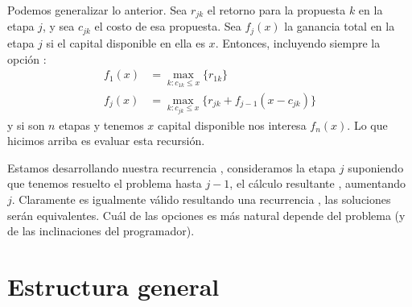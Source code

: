   Podemos generalizar lo anterior.
  Sea \(r_{j k}\) el retorno para la propuesta \(k\) en la etapa \(j\),
  y sea \(c_{j k}\) el costo de esa propuesta.
  Sea \(f_j(x)\) la ganancia total en la etapa \(j\)
  si el capital disponible en ella es \(x\).
  Entonces,
  incluyendo siempre la opción
  :
  \begin{align*}
    f_1(x)
      &= \max_{k \colon c_{1 k} \le x} \{ r_{1 k} \} \\
    f_j(x)
      &= \max_{k \colon c_{j k} \le x} \{ r_{j k} + f_{j - 1}(x - c_{j k}) \}
  \end{align*}
  y si son \(n\) etapas y tenemos \(x\) capital disponible
  nos interesa \(f_n(x)\).
  Lo que hicimos arriba es evaluar esta recursión.

  Estamos desarrollando nuestra recurrencia ,
  consideramos la etapa \(j\) suponiendo
  que tenemos resuelto el problema hasta \(j - 1\),
  el cálculo resultante ,
  aumentando \(j\).
  Claramente es igualmente válido 
  resultando una recurrencia ,
  las soluciones serán equivalentes.
  Cuál de las opciones es más natural depende del problema
  (y de las inclinaciones del programador).

\section{Estructura general}
\label{sec:dp-estructura-general}


